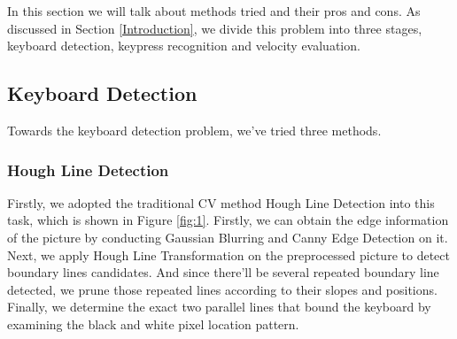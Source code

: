 \documentclass[10pt,twocolumn,letterpaper]{article}
\begin{document}
In this section we will talk about methods tried and their pros and cons. 
As discussed in Section \ref{Introduction}, we divide this problem into three stages, keyboard detection, keypress recognition and velocity evaluation.

\subsection{Keyboard Detection} \label{keyboarddetection}
\label{Keyboard}

Towards the keyboard detection problem, we've tried three methods. 

\subsubsection{Hough Line Detection}
Firstly, we adopted the traditional CV method Hough Line Detection into this task, which is shown in Figure \ref{fig:1}. 
Firstly, we can obtain the edge information of the picture by conducting Gaussian Blurring and Canny Edge Detection on it.
Next, we apply Hough Line Transformation \cite{Hough} on the preprocessed picture to detect boundary lines candidates. 
And since there'll be several repeated boundary line detected, we prune those repeated lines according to their slopes and positions.
Finally, we determine the exact two parallel lines that bound the keyboard by examining the black and white pixel location pattern. 
\end{document}
